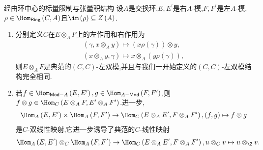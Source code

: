 \begin{remark}{经由环中心的标量限制与张量积结构}{}
	设$A$是交换环,$E,E^{\prime}$是右$A$-模,$F,F^{\prime}$是左$A$-模,$\rho\in\Hom_{\mathsf{Ring}}\left(C,A\right)$且$\im\left(\rho\right)\subseteq Z\left(A\right)$.
	\begin{enumerate}
		\item 分别定义$C$在$E\otimes_{A}F$上的左作用和右作用为
		\begin{gather*}
			\left(\gamma,x\otimes_{A}y\right)\mapsto\left(x\rho\left(\gamma\right)\right)\otimes y,\\
			\left(x\otimes_{A}y,\gamma\right)\mapsto x\otimes_{A}\left(y\rho\left(\gamma\right)\right),
		\end{gather*}
		则$E\otimes_{A}F$是典范的$\left(C,C\right)$-左双模,并且与我们一开始定义的$\left(C,C\right)$-左双模结构完全相同.
		\item 若$f\in\Hom_{\mathsf{Mod}-A}\left(E,E^{\prime}\right),g\in\Hom_{A-\mathsf{Mod}}\left(F,F^{\prime}\right)$,则$f\otimes g\in\Hom_{C}\left(E\otimes_{A}F,E^{\prime}\otimes_{A}F^{\prime}\right)$.进一步,
		\begin{align*}
			\Hom_{A}\left(E,E^{\prime}\right)\times\Hom_{A}\left(F,F^{\prime}\right)\to\Hom_{C}\left(E\otimes_{A}E^{\prime},F\otimes_{A}F^{\prime}\right),\left(f,g\right)\mapsto f\otimes g
		\end{align*}
		是$C$-双线性映射,它进一步诱导了典范的$C$-线性映射
		\begin{align*}
			\Hom_{A}\left(E,E^{\prime}\right)\otimes_{C}\Hom_{A}\left(F,F^{\prime}\right)\to\Hom_{C}\left(E\otimes_{A}E^{\prime},F\otimes_{A}F^{\prime}\right),u\otimes_{C}v\mapsto u\otimes_{\Z}v.
		\end{align*}
	\end{enumerate}
\end{remark}

